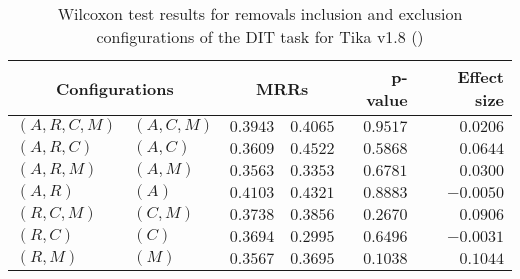 
\begin{table}
\begin{spacing}{1.2}
\centering
\caption{Wilcoxon test results for removals inclusion and exclusion configurations of the DIT task for Tika v1.8 (\ctwo)}
\label{table:versus-wilcox-tika-dit-removals}
\begin{tabular}{ll|rr|rr}
\toprule
      \multicolumn{2}{c|}{Configurations} &                \multicolumn{2}{c|}{MRRs} &             p-value & Effect size \\
\midrule
 $(A,R,C,M)$ &  $(A,C,M)$ &       $0.3943$ &  $\bm{0.4065}$ & $0.9517$ &    $0.0206$ \\
   $(A,R,C)$ &    $(A,C)$ &       $0.3609$ &  $\bm{0.4522}$ & $0.5868$ &    $0.0644$ \\
   $(A,R,M)$ &    $(A,M)$ &  $\bm{0.3563}$ &       $0.3353$ & $0.6781$ &    $0.0300$ \\
     $(A,R)$ &      $(A)$ &       $0.4103$ &  $\bm{0.4321}$ & $0.8883$ &   $-0.0050$ \\
   $(R,C,M)$ &    $(C,M)$ &       $0.3738$ &  $\bm{0.3856}$ & $0.2670$ &    $0.0906$ \\
     $(R,C)$ &      $(C)$ &  $\bm{0.3694}$ &       $0.2995$ & $0.6496$ &   $-0.0031$ \\
     $(R,M)$ &      $(M)$ &       $0.3567$ &  $\bm{0.3695}$ & $0.1038$ &    $0.1044$ \\
\bottomrule
\end{tabular}

\end{spacing}
\end{table}

